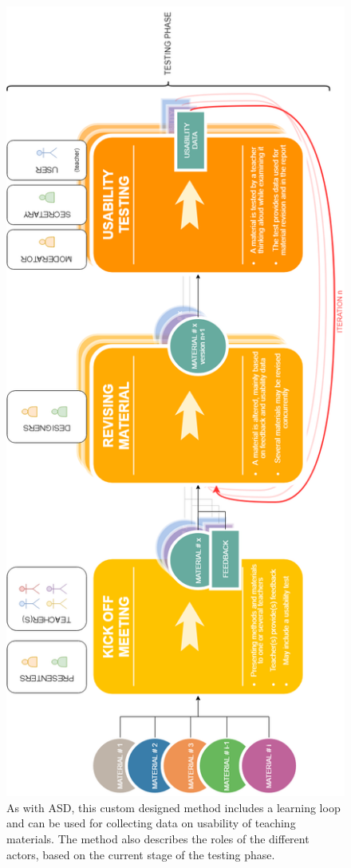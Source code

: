 \begin{figure}
\centering
\includegraphics[scale=0.6,angle=-90]{figure/workflow.png}
\vspace*{2cm}
\caption{As with ASD, this custom designed method includes a learning loop and can be used for collecting data on usability
of teaching materials. The method also describes the roles of the different actors, based on the current stage of the testing
phase.}
\label{workflow}
\end{figure}

